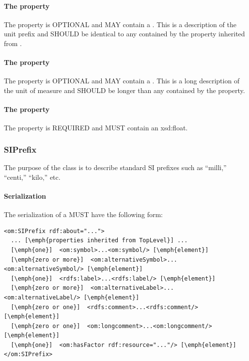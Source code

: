 \paragraph{The  property}\label{sec:comment:Prefix}
The  property is OPTIONAL and MAY contain a . This  is a description of the unit prefix and SHOULD be identical to any  contained by the  property inherited from .

\paragraph{The  property}\label{sec:longcomment:Prefix}
The  property is OPTIONAL and MAY contain a . This  is a long description of the unit of measure and SHOULD be longer than any  contained by the  property.

\paragraph{The  property}\label{sec:hasFactor:Prefix}
The  property is REQUIRED and MUST contain an xsd:float.


\subsubsection{SIPrefix}
\label{sec:SIPrefix}

The purpose of the  class is to describe standard SI prefixes such as ``milli,'' ``centi,'' ``kilo,'' etc. 

\paragraph{Serialization}
The serialization of a  MUST have the following form:


\begin{lstlisting}
<om:SIPrefix rdf:about="...">
  ... [\emph{properties inherited from TopLevel}] ...
  [\emph{one}]  <om:symbol>...<om:symbol/> [\emph{element}]
  [\emph{zero or more}]  <om:alternativeSymbol>...<om:alternativeSymbol/> [\emph{element}]
  [\emph{one}]  <rdfs:label>...<rdfs:label/> [\emph{element}]
  [\emph{zero or more}]  <om:alternativeLabel>...<om:alternativeLabel/> [\emph{element}]
  [\emph{zero or one}]  <rdfs:comment>...<rdfs:comment/> [\emph{element}]
  [\emph{zero or one}]  <om:longcomment>...<om:longcomment/> [\emph{element}]
  [\emph{one}]  <om:hasFactor rdf:resource="..."/> [\emph{element}]
</om:SIPrefix>
\end{lstlisting}


